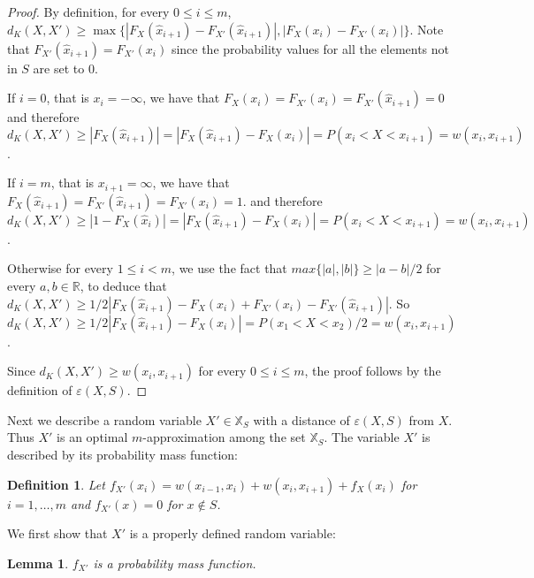 \documentclass{article}
\newtheorem{lemma}[thm]{Lemma}
\newtheorem{definition}[thm]{Definition}
\begin{document}
	\begin{proof}
		
		
		By definition, for every $0\leq i\leq m$, $d_K(X,X') \geq \max \{|F_X(\hat x_{i+1}) - F_{X'}(\hat x_{i+1})|,|F_X(x_i) - F_{X'}(x_i)| \}$. Note that $F_{X'}(\hat x_{i+1})=F_{X'}(x_i)$ since the probability values for all the elements not in $S$ are set to $0$.
		
		If $i=0$, that is $x_i=-\infty$, we have that $F_X(x_i)=F_{X'}(x_i)=F_{X'}(\hat x_{i+1})=0$ and therefore $d_K(X,X') \geq |F_X(\hat x_{i+1})| = |F_X(\hat x_{i+1}) - F_{X}(x_i)| =  P(x_i < X < x_{i+1})= w(x_i,x_{i+1})$.
		
		If $i =m$, that is $x_{i+1}=\infty$, we have that $F_X(\hat x_{i+1})=F_{X'}(\hat x_{i+1})=F_{X'}(x_i)=1$. 
		and therefore $d_K(X,X') \geq |1-F_X(\hat x_i)| = |F_X(\hat x_{i+1}) - F_{X}(x_i)| =  P(x_i < X < x_{i+1}) = w(x_i,x_{i+1})$. 
		
		
		Otherwise for every $1\leq i< m$,  we use the fact that $max\{|a|,|b|\} \geq |a-b|/2$ for every $a,b\in\mathbb{R}$, to deduce that $d_K(X,X') \geq 1/2| F_X(\hat x_{i+1}) - F_X(x_i) + F_{X'}(x_i) -F_{X'}(\hat x_{i+1})|$. So $d_K(X,X') \geq 1/2| F_X(\hat x_{i+1}) - F_X(x_i) | =P(x_1 < X < x_2)/2 = w(x_i,x_{i+1})$. 
		
		Since $d_K(X,X') \geq  w(x_i,x_{i+1})$ for every $0\leq i\leq m$, the proof follows by the definition of $\varepsilon(X,S)$.
	\end{proof}
	
	
	
	Next we describe a random variable $X'\in\mathbb{X}_S$ with a distance of $\varepsilon(X,S)$ from $X$. Thus $X'$ is an optimal $m$-approximation among the set $\mathbb{X}_S$. The variable $X'$ is described by its probability mass function:
	
	\begin{definition}\label{def:construction}
		Let $f_{X'}(x_{i}) = w(x_{i-1},x_i) + w(x_i,x_{i+1}) + f_{X}(x_i)$ for $i=1,\dots,m$ and $f_{X'}(x)=0$ for $x \notin S$.
	\end{definition}
	
	We first show that $X'$ is a properly defined random variable:
	
	\begin{lemma}
		$f_{X'}$ is a probability mass function. 
	\end{lemma}
	
\end{document}
